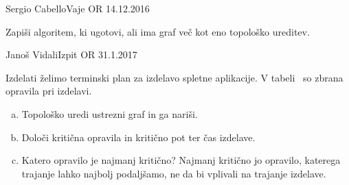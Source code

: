 \begin{naloga}{Sergio Cabello}{Vaje OR 14.12.2016}
\begin{vprasanje}
Zapiši algoritem, ki ugotovi, ali ima graf več kot eno topološko ureditev.
\end{vprasanje}
\begin{odgovor}
\end{odgovor}
\end{naloga}


\begin{naloga}{Janoš Vidali}{Izpit OR 31.1.2017}
\begin{vprasanje}[splet]
Izdelati želimo terminski plan za izdelavo spletne aplikacije.
V tabeli~\tab{} so zbrana opravila pri izdelavi.

\begin{enumerate}[(a)]
\item Topološko uredi ustrezni graf in ga nariši.
\item Določi kritična opravila in kritično pot ter čas izdelave.
\item Katero opravilo je najmanj kritično?
Najmanj kritično jo opravilo, katerega trajanje lahko najbolj podaljšamo,
ne da bi vplivali na trajanje izdelave.
\end{enumerate}

\begin{tabela}
\end{tabela}
\end{vprasanje}
\begin{odgovor}
\end{odgovor}
\end{naloga}


